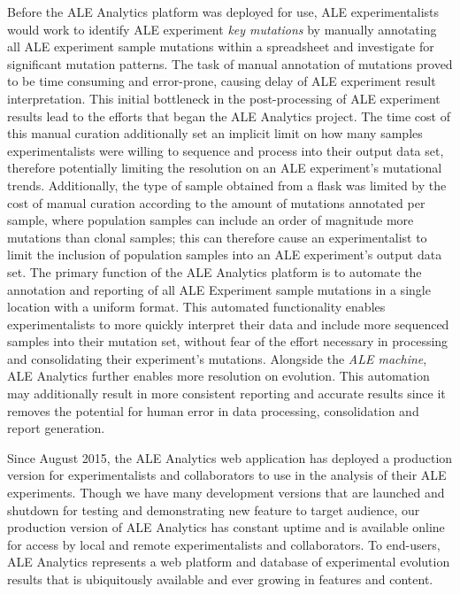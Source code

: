 \documentclass[12pt,final,masters,chapterheads]{ucsd}  %
\begin{document}
%
%
Before the ALE Analytics platform was deployed for use, ALE experimentalists would work to identify ALE experiment \textit{key mutations} by manually annotating all ALE experiment sample mutations within a spreadsheet and investigate for significant mutation patterns. The task of manual annotation of mutations proved to be time consuming and error-prone, causing delay of ALE experiment result interpretation. This initial bottleneck in the post-processing of ALE experiment results lead to the efforts that began the ALE Analytics project. The time cost of this manual curation additionally set an implicit limit on how many samples experimentalists were willing to sequence and process into their output data set, therefore potentially limiting the resolution on an ALE experiment's mutational trends. Additionally, the type of sample obtained from a flask was limited by the cost of manual curation according to the amount of mutations annotated per sample, where population samples can include an order of magnitude more mutations than clonal samples; this can therefore cause an experimentalist to limit the inclusion of population samples into an ALE experiment's output data set. The primary function of the ALE Analytics platform is to automate the annotation and reporting of all ALE Experiment sample mutations in a single location with a uniform format. This automated functionality enables experimentalists to more quickly interpret their data and include more sequenced samples into their mutation set, without fear of the effort necessary in processing and consolidating their experiment's mutations. Alongside the \textit{ALE machine}, ALE Analytics further enables more resolution on evolution. This automation may additionally result in more  consistent reporting and accurate results since it removes the potential for human error in data processing, consolidation and report generation.

Since August 2015, the ALE Analytics web application has deployed a production version for experimentalists and collaborators to use in the analysis of their ALE experiments. Though we have many development versions that are launched and shutdown for testing and demonstrating new feature to target audience, our production version of ALE Analytics has constant uptime and is available online for access by local and remote experimentalists and collaborators. To end-users, ALE Analytics represents a web platform and database of experimental evolution results that is ubiquitously available and ever growing in features and content.
\end{document}
